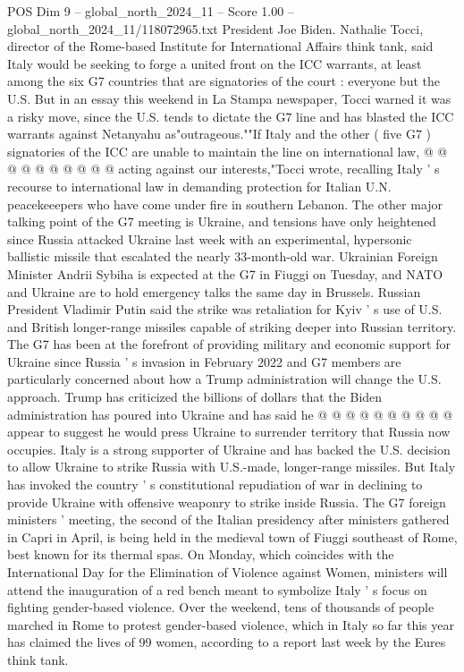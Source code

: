 \begin{textsample}{POS Dim 9 – global\_north\_2024\_11 – Score 1.00 – global\_north\_2024\_11/118072965.txt}
President Joe Biden.
Nathalie Tocci, director of the Rome-based Institute for International Affairs think tank, said Italy would be seeking to forge a united front on the ICC warrants, at least among the six G7 countries that are signatories of the court : everyone but the U.S.
But in an essay this weekend in La Stampa newspaper, Tocci warned it was a risky move, since the U.S. tends to dictate the G7 line and has blasted the ICC warrants against Netanyahu as"outrageous.""If Italy and the other ( five G7 ) signatories of the ICC are unable to maintain the line on international law, @ @ @ @ @ @ @ @ @ @ acting against our interests,"Tocci wrote, recalling Italy ' s recourse to international law in demanding protection for Italian U.N. peacekeeepers who have come under fire in southern Lebanon.
The other major talking point of the G7 meeting is Ukraine, and tensions have only heightened since Russia attacked Ukraine last week with an experimental, hypersonic ballistic missile that escalated the nearly 33-month-old war.
Ukrainian Foreign Minister Andrii Sybiha is expected at the G7 in Fiuggi on Tuesday, and NATO and Ukraine are to hold emergency talks the same day in Brussels.
Russian President Vladimir Putin said the strike was retaliation for Kyiv ' s use of U.S. and British longer-range missiles capable of striking deeper into Russian territory.
The G7 has been at the forefront of providing military and economic support for Ukraine since Russia ' s invasion in February 2022 and G7 members are particularly concerned about how a Trump administration will change the U.S. approach.
Trump has criticized the billions of dollars that the Biden administration has poured into Ukraine and has said he @ @ @ @ @ @ @ @ @ @ appear to suggest he would press Ukraine to surrender territory that Russia now occupies.
Italy is a strong supporter of Ukraine and has backed the U.S. decision to allow Ukraine to strike Russia with U.S.-made, longer-range missiles.
But Italy has invoked the country ' s constitutional repudiation of war in declining to provide Ukraine with offensive weaponry to strike inside Russia.
The G7 foreign ministers ' meeting, the second of the Italian presidency after ministers gathered in Capri in April, is being held in the medieval town of Fiuggi southeast of Rome, best known for its thermal spas.
On Monday, which coincides with the International Day for the Elimination of Violence against Women, ministers will attend the inauguration of a red bench meant to symbolize Italy ' s focus on fighting gender-based violence.
Over the weekend, tens of thousands of people marched in Rome to protest gender-based violence, which in Italy so far this year has claimed the lives of 99 women, according to a report last week by the Eures think tank.

\end{textsample}
